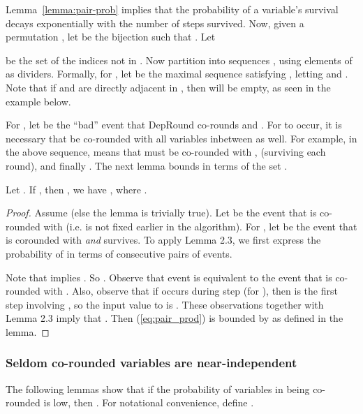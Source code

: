 \smallskip
Lemma~\ref{lemma:pair-prob} implies that the probability of a variable's survival decays exponentially with the number of steps survived. Now, given a permutation , let  be the bijection such that . 
Let 
 
be the set of the indices not in . Now partition  into sequences , using elements of  as dividers. Formally, for , let  be the maximal sequence  satisfying , letting  and . Note that if  and  are directly adjacent in , then  will be empty, as seen in the example below. 


For , let  be the ``bad'' event that {\sc DepRound} co-rounds  and . For  to occur, it is necessary that  be co-rounded with all variables inbetween as well. For example, in the above sequence,  means that  must be co-rounded with , (surviving each round), and finally . The next lemma bounds  in terms of the set .

\begin{lemma}\label{lemma:zbound}
Let . If , then , we have , where .
\end{lemma}

\begin{proof}
Assume  (else the lemma is trivially true).
Let  be the event that  is co-rounded with  (i.e. is not fixed earlier in the algorithm).
For , let  be the event that  is corounded with  \emph{and} survives. To apply Lemma 2.3, we first express the probability of  in terms of consecutive pairs of events.



Note that  implies . So .
Observe that event  is equivalent to the event that  is co-rounded with . Also, observe that if  occurs during step  (for ), then  is the first step involving , so the input value to  is . These observations together with Lemma 2.3 imply that . Then (\ref{eq:pair_prod}) is bounded by  as defined in the lemma.
\end{proof}

\subsubsection{Seldom co-rounded variables are near-independent}

The following lemmas show that if the probability of variables in  being co-rounded is low, then . For notational convenience, define .

